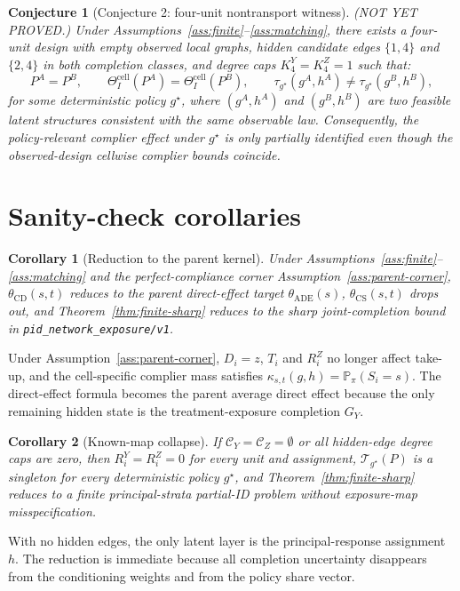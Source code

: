 \documentclass[11pt]{article}
\renewcommand{\Pr}{\mathbb{P}}
\theoremstyle{definition}
\theoremstyle{plain}
\newtheorem{conjecture}{Conjecture}
\newtheorem{corollary}{Corollary}
\theoremstyle{remark}
\begin{document}
\begin{conjecture}[Conjecture 2: four-unit nontransport witness]\label{conj:witness}
(NOT YET PROVED.) Under Assumptions~\ref{ass:finite}--\ref{ass:matching}, there exists a four-unit design with empty observed local graphs, hidden candidate edges \(\{1,4\}\) and \(\{2,4\}\) in both completion classes, and degree caps \(K^Y_4=K^Z_4=1\) such that:
\[
P^{A}=P^{B},\qquad
\Theta_I^{\mathrm{cell}}(P^{A})=\Theta_I^{\mathrm{cell}}(P^{B}),
\qquad
\tau_{g^\star}(g^{A},h^{A})\neq \tau_{g^\star}(g^{B},h^{B}),
\]
for some deterministic policy \(g^\star\), where \((g^{A},h^{A})\) and \((g^{B},h^{B})\) are two feasible latent structures consistent with the same observable law. Consequently, the policy-relevant complier effect under \(g^\star\) is only partially identified even though the observed-design cellwise complier bounds coincide.
\end{conjecture}

\section{Sanity-check corollaries}
\begin{corollary}[Reduction to the parent kernel]\label{cor:parent}
Under Assumptions~\ref{ass:finite}--\ref{ass:matching} and the perfect-compliance corner Assumption~\ref{ass:parent-corner}, \(\theta_{\mathrm{CD}}(s,t)\) reduces to the parent direct-effect target \(\theta_{\mathrm{ADE}}(s)\), \(\theta_{\mathrm{CS}}(s,t)\) drops out, and Theorem~\ref{thm:finite-sharp} reduces to the sharp joint-completion bound in \texttt{pid\_network\_exposure/v1}.
\end{corollary}
Under Assumption~\ref{ass:parent-corner}, \(D_i=z\), \(T_i\) and \(R_i^Z\) no longer affect take-up, and the cell-specific complier mass satisfies \(\kappa_{s,t}(g,h)=\Pr_\pi(S_i=s)\). The direct-effect formula becomes the parent average direct effect because the only remaining hidden state is the treatment-exposure completion \(G_Y\).

\begin{corollary}[Known-map collapse]\label{cor:known}
If \(\mathcal C_Y=\mathcal C_Z=\emptyset\) or all hidden-edge degree caps are zero, then \(R_i^Y=R_i^Z=0\) for every unit and assignment, \(\mathcal T_{g^\star}(P)\) is a singleton for every deterministic policy \(g^\star\), and Theorem~\ref{thm:finite-sharp} reduces to a finite principal-strata partial-ID problem without exposure-map misspecification.
\end{corollary}
With no hidden edges, the only latent layer is the principal-response assignment \(h\). The reduction is immediate because all completion uncertainty disappears from the conditioning weights and from the policy share vector.
\end{document}
